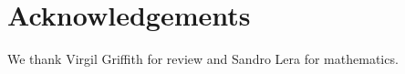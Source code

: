 \documentclass[12pt, final]{article}
\begin{document}
\section{Acknowledgements}

We thank Virgil Griffith for review and Sandro Lera for mathematics.





%

\end{document}
